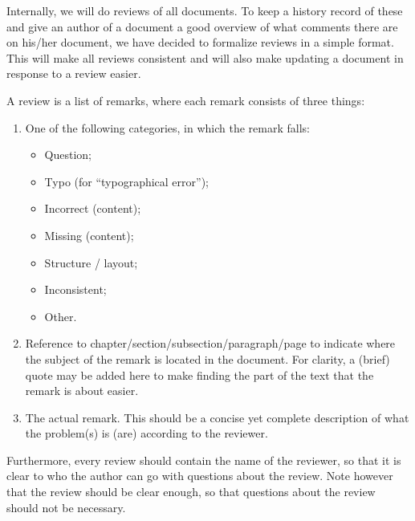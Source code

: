 Internally, we will do reviews of all documents. To keep a history record of these and give an author of a document a good overview of what comments there are on his/her document, we have decided to formalize reviews in a simple format. This will make all reviews consistent and will also make updating a document in response to a review easier.

A review is a list of remarks, where each remark consists of three things:
\begin{enumerate}
	\item One of the following categories, in which the remark falls:
		\begin{itemize}
			\item Question;
			\item Typo (for ``typographical error'');
			\item Incorrect (content);
			\item Missing (content);
			\item Structure / layout;
			\item Inconsistent;
			\item Other.
		\end{itemize}
	\item Reference to chapter/section/subsection/paragraph/page to indicate where the subject of the remark is located in the document. For clarity, a (brief) quote may be added here to make finding the part of the text that the remark is about easier.
	\item The actual remark. This should be a concise yet complete description of what the problem(s) is (are) according to the reviewer.
\end{enumerate}

Furthermore, every review should contain the name of the reviewer, so that it is clear to who the author can go with questions about the review. Note however that the review should be clear enough, so that questions about the review should not be necessary.
